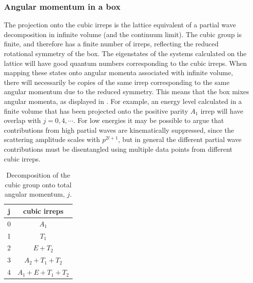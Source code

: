 \subsubsection{Angular momentum in a box}

The projection onto the cubic irreps is the lattice equivalent of a partial wave decomposition in infinite volume (and the continuum limit). The cubic group is finite, and therefore has a finite number of irreps, reflecting the reduced rotational symmetry of the box. The eigenstates of the systems calculated on the lattice will have good quantum numbers corresponding to the cubic irreps. When mapping these states onto angular momenta associated with infinite volume, there will necessarily be copies of the same irrep corresponding to the same angular momentum due to the reduced symmetry. This means that the box mixes angular momenta, as displayed in . For example, an energy level calculated in a finite volume that has been projected onto the positive parity $A_1$ irrep will have overlap with $j=0,4,\cdots$. For low energies it may be possible to argue that contributions from high partial waves are kinematically suppressed, since the scattering amplitude scales with $p^{2l+1}$, but in general the different partial wave contributions must be disentangled using multiple data points from different cubic irreps. 

\begin{table}[h!]
\label{tab:cubicirreps}
\begin{center}
\begin{tabular}{cc}
 j \hspace{1mm} & cubic irreps \\
 \hline
 0  \hspace{1mm}& $A_1$ \\
 1 \hspace{1mm} & $T_1$ \\
 2 \hspace{1mm} & $E+T_2$ \\
 3 \hspace{1mm} & $A_2 + T_1 + T_2$ \\
 4 \hspace{1mm} & $A_1 + E + T_1 + T_2$ \\
 \end{tabular}
 \end{center}
 \caption{Decomposition of the cubic group onto total angular momentum, $j$.}
 \end{table}
 
